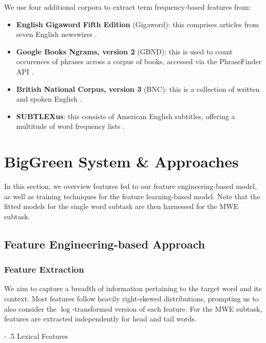 \documentclass[11pt,a4paper]{article}
\makeatletter
\renewcommand\paragraph{%
    \@startsection{paragraph}{4}{0mm}%
        {-\baselineskip}%
        {.5\baselineskip}%
        {\normalfont\normalsize\bfseries}}
\makeatother
\begin{document}
We use four additional corpora to extract term frequency-based features from:

\begin{itemize}
  \item \noindent \textbf{English Gigaword Fifth Edition} (Gigaword): this comprises articles from seven English newswires \citep{gigaword}.
  \item \noindent \textbf{Google Books Ngrams, version 2} (GBND): this is used to count occurences of phrases across a corpus of books, accessed via the PhraseFinder API \citep{phrasefinder}.
  \item \noindent \textbf{British National Corpus, version 3} (BNC): this is a collection of written and spoken English \citep{BNC}.
  \item \noindent \textbf{SUBTLEXus}: this consists of American English subtitles, offering a multitude of word frequency lists \citep{Brysbaert2009MovingBK}.
\end{itemize}

\section{BigGreen System \& Approaches}

In this section, we overview features fed to our feature engineering-based model, as well as training techniques for the feature learning-based model. Note that the fitted models for the single word subtask are then harnessed for the MWE subtask.

\subsection{Feature Engineering-based Approach}

\subsubsection{Feature Extraction}

We aim to capture a breadth of information pertaining to the target word and its context. Most features follow heavily right-skewed distributions, prompting us to also consider the $\log$-transformed version of each feature. For the MWE subtask, features are extracted independently for head and tail words. 

\paragraph{Lexical Features}
\end{document}
